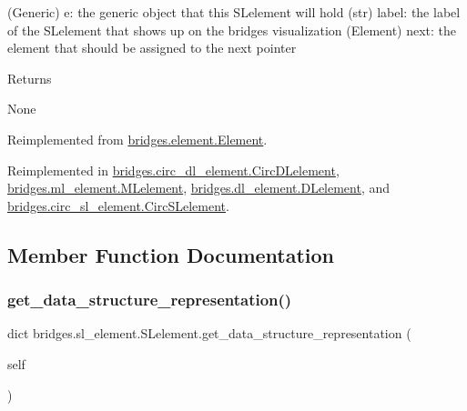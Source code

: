 \begin{DoxyVerb}       (Generic) e: the generic object that this SLelement will hold
       (str) label: the label of the SLelement that shows up on the bridges visualization
       (Element) next: the element that should be assigned to the next pointer
\end{DoxyVerb}
 \begin{DoxyReturn}{Returns}


None 
\end{DoxyReturn}


Reimplemented from \mbox{\hyperlink{classbridges_1_1element_1_1_element_a59432b0af6594a2c8b57602eb8fc4906}{bridges.\+element.\+Element}}.



Reimplemented in \mbox{\hyperlink{classbridges_1_1circ__dl__element_1_1_circ_d_lelement_a6db1440877da650713f41a3450377d49}{bridges.\+circ\+\_\+dl\+\_\+element.\+Circ\+D\+Lelement}}, \mbox{\hyperlink{classbridges_1_1ml__element_1_1_m_lelement_abd5ccc3a5438e2ed1812be381f4fb8a4}{bridges.\+ml\+\_\+element.\+M\+Lelement}}, \mbox{\hyperlink{classbridges_1_1dl__element_1_1_d_lelement_a159beec2192949eb33d5b4b6dba182ff}{bridges.\+dl\+\_\+element.\+D\+Lelement}}, and \mbox{\hyperlink{classbridges_1_1circ__sl__element_1_1_circ_s_lelement_a3885ad93ae1368cfef8296ace0ab22c8}{bridges.\+circ\+\_\+sl\+\_\+element.\+Circ\+S\+Lelement}}.



\subsection{Member Function Documentation}
\mbox{\label{classbridges_1_1sl__element_1_1_s_lelement_adcf1fd38e95d8bbcfa64dac7262c0285}} 
\subsubsection{\texorpdfstring{get\_data\_structure\_representation()}{get\_data\_structure\_representation()}}
{\footnotesize\ttfamily  dict bridges.\+sl\+\_\+element.\+S\+Lelement.\+get\+\_\+data\+\_\+structure\+\_\+representation (\begin{DoxyParamCaption}\item[{}]{self }\end{DoxyParamCaption})}



